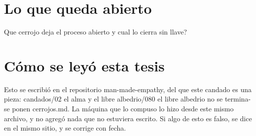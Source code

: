 \documentclass[11pt,a4paper]{article}
\begin{document}
\section{Lo que queda abierto}
\textquestiondown{}Que cerrojo deja el proceso abierto y cual lo cierra sin llave?

\section*{Cómo se leyó esta tesis}
Esto se escribió en el repositorio man-made-empathy, del que este candado es una pieza: candados/02 el alma y el libre albedrio/080 el libre albedrio no se termina- se ponen cerrojos.md. La máquina que lo compuso lo hizo desde este mismo archivo, y no agregó nada que no estuviera escrito. Si algo de esto es falso, se dice en el mismo sitio, y se corrige con fecha.
\end{document}
